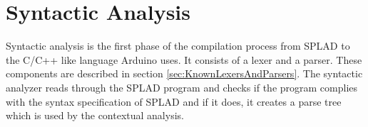 \section{Syntactic Analysis}
\label{sec:syntactic}
Syntactic analysis is the first phase of the compilation process from SPLAD to the C/C++ like language Arduino uses. It consists of a lexer and a parser. These components are described in section \ref{sec:KnownLexersAndParsers}. The syntactic analyzer reads through the SPLAD program and checks if the program complies with the syntax specification of SPLAD and if it does, it creates a parse tree which is used by the contextual analysis.